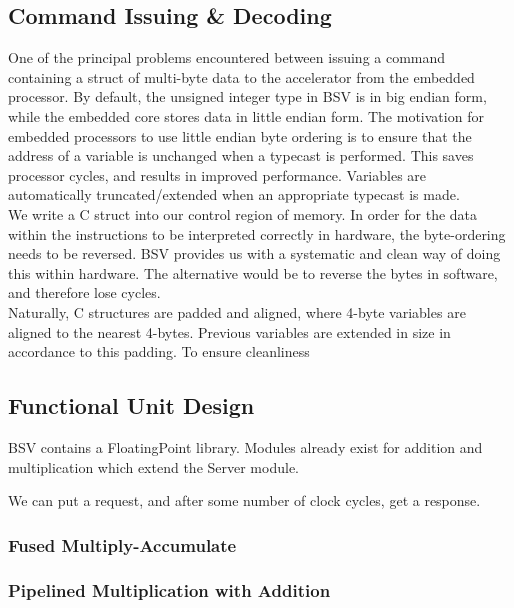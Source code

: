 \documentclass[a4paper,9pt]{report}
\begin{document}
\subsection{Command Issuing \& Decoding}
One of the principal problems encountered between issuing a command containing
a struct of multi-byte data to the accelerator from the embedded processor. By
default, the unsigned integer type in BSV is in big endian form, while the
embedded core stores data in little endian form. The motivation for embedded
processors to use little endian byte ordering is to ensure that the address of a
variable is unchanged when a typecast is performed. This saves processor cycles,
and results in improved performance. Variables are automatically
truncated/extended when an appropriate typecast is made. \\

We write a C struct into our control region of memory. In order for the data
within the instructions to be interpreted correctly in hardware, the
byte-ordering needs to be reversed. BSV provides us with a systematic and clean
way of doing this within hardware. The alternative would be to reverse the bytes
in software, and therefore lose cycles. \\


Naturally, C structures are padded and aligned, where 4-byte variables are
aligned to the nearest 4-bytes. Previous variables are extended in size in
accordance to this padding. To ensure cleanliness 

\subsection{Functional Unit Design}
BSV contains a FloatingPoint library. Modules already exist for addition and
multiplication which extend the Server module. 

We can put a request, and after some number of clock cycles, get a response.

\subsubsection{Fused Multiply-Accumulate}


\subsubsection{Pipelined Multiplication with Addition}
\end{document}
